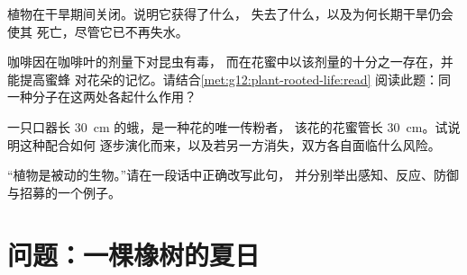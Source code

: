 \begin{exercise}[$\star\star\star$]\label{exo:g12:plant-rooted-life:12}
植物在干旱期间关闭。说明它获得了什么，
失去了什么，以及为何长期干旱仍会使其
死亡，尽管它已不再失水。
\end{exercise}

\begin{exercise}[$\star\star\star$]\label{exo:g12:plant-rooted-life:13}
咖啡因在咖啡叶的剂量下对昆虫有毒，
而在花蜜中以该剂量的十分之一存在，并能提高蜜蜂
对花朵的记忆。请结合\cref{met:g12:plant-rooted-life:read}
阅读此题：同一种分子在这两处各起什么作用？
\end{exercise}

\begin{exercise}[$\star\star\star$]\label{exo:g12:plant-rooted-life:14}
一只口器长 \qty{30}{cm} 的蛾，是一种花的唯一传粉者，
该花的花蜜管长 \qty{30}{cm}。试说明这种配合如何
逐步演化而来，以及若另一方消失，双方各自面临什么风险。
\end{exercise}

\begin{exercise}[$\star\star\star$]\label{exo:g12:plant-rooted-life:15}
“植物是被动的生物。”请在一段话中正确改写此句，
并分别举出感知、反应、防御
与招募的一个例子。
\end{exercise}

\section{问题：一棵橡树的夏日}

